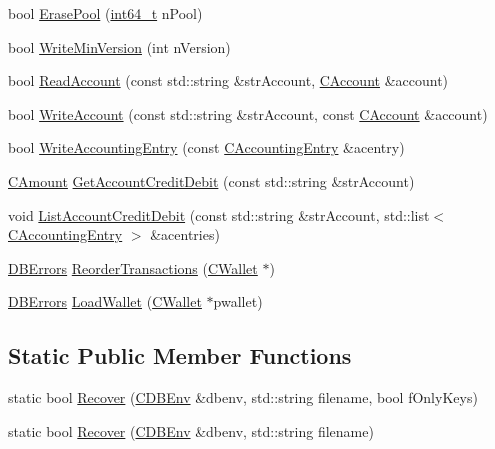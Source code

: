 \begin{DoxyCompactItemize}
\item 
bool \hyperlink{class_c_wallet_d_b_ac78d839fbda5164c4134ab67911139ca}{Erase\+Pool} (\hyperlink{stdint_8h_adec1df1b8b51cb32b77e5b86fff46471}{int64\+\_\+t} n\+Pool)
\item 
bool \hyperlink{class_c_wallet_d_b_ab008b6c6e09a60a988cac6e1a9e11886}{Write\+Min\+Version} (int n\+Version)
\item 
bool \hyperlink{class_c_wallet_d_b_afa8d9d374072629b360adb49b9bdd584}{Read\+Account} (const std\+::string \&str\+Account, \hyperlink{class_c_account}{C\+Account} \&account)
\item 
bool \hyperlink{class_c_wallet_d_b_afef640a4990f74fd5af7178c99415cf3}{Write\+Account} (const std\+::string \&str\+Account, const \hyperlink{class_c_account}{C\+Account} \&account)
\item 
bool \hyperlink{class_c_wallet_d_b_a958a0138b171e213be35f48933adcb89}{Write\+Accounting\+Entry} (const \hyperlink{class_c_accounting_entry}{C\+Accounting\+Entry} \&acentry)
\item 
\hyperlink{amount_8h_a4eaf3a5239714d8c45b851527f7cb564}{C\+Amount} \hyperlink{class_c_wallet_d_b_af924f6275a873e048699e6ef0bf66346}{Get\+Account\+Credit\+Debit} (const std\+::string \&str\+Account)
\item 
void \hyperlink{class_c_wallet_d_b_a51555c82291fe16081880110541e207f}{List\+Account\+Credit\+Debit} (const std\+::string \&str\+Account, std\+::list$<$ \hyperlink{class_c_accounting_entry}{C\+Accounting\+Entry} $>$ \&acentries)
\item 
\hyperlink{walletdb_8h_a7558d92e9ea1d446075da1b514c4a944}{D\+B\+Errors} \hyperlink{class_c_wallet_d_b_afc27d9c9eef8b31851e6b02dc3191425}{Reorder\+Transactions} (\hyperlink{class_c_wallet}{C\+Wallet} $\ast$)
\item 
\hyperlink{walletdb_8h_a7558d92e9ea1d446075da1b514c4a944}{D\+B\+Errors} \hyperlink{class_c_wallet_d_b_a14f26e53502d1a60dd2b034f830acf03}{Load\+Wallet} (\hyperlink{class_c_wallet}{C\+Wallet} $\ast$pwallet)
\end{DoxyCompactItemize}
\subsection*{Static Public Member Functions}
\begin{DoxyCompactItemize}
\item 
static bool \hyperlink{class_c_wallet_d_b_a3ebeb12f37d9c66512e2bc2903a6854a}{Recover} (\hyperlink{class_c_d_b_env}{C\+D\+B\+Env} \&dbenv, std\+::string filename, bool f\+Only\+Keys)
\item 
static bool \hyperlink{class_c_wallet_d_b_a44388f1c3ee63191dcb78b1001e9390c}{Recover} (\hyperlink{class_c_d_b_env}{C\+D\+B\+Env} \&dbenv, std\+::string filename)
\end{DoxyCompactItemize}
